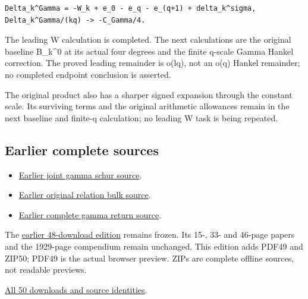 \documentclass[
]{article}
\providecommand{\tightlist}{%
  \setlength{\itemsep}{0pt}\setlength{\parskip}{0pt}}
\begin{document}
\begin{verbatim}
Delta_k^Gamma = -W_k + e_0 - e_q - e_(q+1) + delta_k^sigma,
Delta_k^Gamma/(kq) -> -C_Gamma/4.
\end{verbatim}

The leading W calculation is completed. The next calculations are the
original baseline B\_k\^{}0 at its actual four degrees and the finite
q-scale Gamma Hankel correction. The proved leading remainder is o(lq),
not an o(q) Hankel remainder; no completed endpoint conclusion is
asserted.

The original product also has a sharper signed expansion through the
constant scale. Its surviving terms and the original arithmetic
allowances remain in the next baseline and finite-q calculation; no
leading W task is being repeated.

\subsection{Earlier complete sources}\label{earlier-complete-sources-1}

\begin{itemize}
\tightlist
\item
  \href{https://github.com/KokunoYumeto/zeta-function-research-reader/tree/2be3b23974bf040f4ea06240b8a4b85372f7c71d/workbenches/splitzero-tandem/continuations/20260914-joint-gamma-schur}{Earlier
  joint gamma schur source}.
\item
  \href{https://github.com/KokunoYumeto/zeta-function-research-reader/tree/01fc8820e3a3ea69afa22b8ab1b0b5ca61869456/workbenches/splitzero-tandem/continuations/20260914-original-relation-bulk}{Earlier
  original relation bulk source}.
\item
  \href{https://github.com/KokunoYumeto/zeta-function-research-reader/tree/01fc8820e3a3ea69afa22b8ab1b0b5ca61869456/workbenches/splitzero-tandem/continuations/20260914-complete-gamma-return}{Earlier
  complete gamma return source}.
\end{itemize}

The \href{https://doi.org/10.5281/zenodo.22754516}{earlier 48-download
edition} remains frozen. Its 15-, 33- and 46-page papers and the
1929-page compendium remain unchanged. This edition adds PDF49 and
ZIP50; PDF49 is the actual browser preview. ZIPs are complete offline
sources, not readable previews.

\href{calculation_edition_20260914_gamma_growth/README.md}{All 50
downloads and source identities}.
\end{document}
